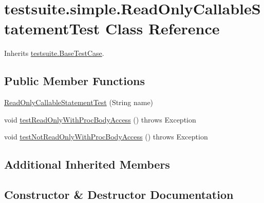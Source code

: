 \hypertarget{classtestsuite_1_1simple_1_1_read_only_callable_statement_test}{}\section{testsuite.\+simple.\+Read\+Only\+Callable\+Statement\+Test Class Reference}
\label{classtestsuite_1_1simple_1_1_read_only_callable_statement_test}


Inherits \mbox{\hyperlink{classtestsuite_1_1_base_test_case}{testsuite.\+Base\+Test\+Case}}.

\subsection*{Public Member Functions}
\begin{DoxyCompactItemize}
\item 
\mbox{\hyperlink{classtestsuite_1_1simple_1_1_read_only_callable_statement_test_a7328276b96ae1e6ed3a7ac15bcf21839}{Read\+Only\+Callable\+Statement\+Test}} (String name)
\item 
void \mbox{\hyperlink{classtestsuite_1_1simple_1_1_read_only_callable_statement_test_a1bfe6cc23301567c3f84a0322a6c1e17}{test\+Read\+Only\+With\+Proc\+Body\+Access}} ()  throws Exception 
\item 
void \mbox{\hyperlink{classtestsuite_1_1simple_1_1_read_only_callable_statement_test_a2966846eec146e9d0a6e8fdbf6cdcc32}{test\+Not\+Read\+Only\+With\+Proc\+Body\+Access}} ()  throws Exception 
\end{DoxyCompactItemize}
\subsection*{Additional Inherited Members}


\subsection{Constructor \& Destructor Documentation}
\mbox{\label{classtestsuite_1_1simple_1_1_read_only_callable_statement_test_a7328276b96ae1e6ed3a7ac15bcf21839}} 
